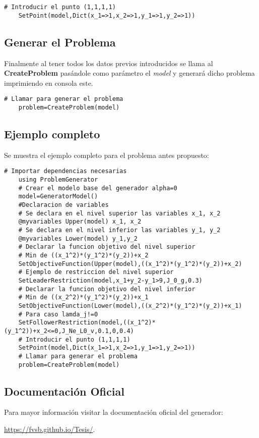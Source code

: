 \begin{lstlisting}[caption={Introducir el punto $(1,1,1,1)$}]
    # Introducir el punto (1,1,1,1)
    SetPoint(model,Dict(x_1=>1,x_2=>1,y_1=>1,y_2=>1))
\end{lstlisting}

\subsection{Generar el Problema}
Finalmente al tener todos los datos previos introducidos se llama al \textbf{CreateProblem} pasándole como parámetro el \textit{model} 
y generará dicho problema imprimiendo en consola este.

\begin{lstlisting}[caption={Generar el problema}]
    # Llamar para generar el problema
    problem=CreateProblem(model)
\end{lstlisting}
\begin{samepage}
    
\subsection{Ejemplo completo}
Se muestra el ejemplo completo para el problema antes propuesto:
\begin{lstlisting}[caption={Script}]
    # Importar dependencias necesarias
    using ProblemGenerator
    # Crear el modelo base del generador alpha=0
    model=GeneratorModel()
    #Declaracion de variables
    # Se declara en el nivel superior las variables x_1, x_2
    @myvariables Upper(model) x_1, x_2
    # Se declara en el nivel inferior las variables y_1, y_2
    @myvariables Lower(model) y_1,y_2
    # Declarar la funcion objetivo del nivel superior
    # Min de ((x_1^2)*(y_1^2)*(y_2))+x_2
    SetObjectiveFunction(Upper(model),((x_1^2)*(y_1^2)*(y_2))+x_2)
    # Ejemplo de restriccion del nivel superior
    SetLeaderRestriction(model,x_1+y_2-y_1>9,J_0_g,0.3)
    # Declarar la funcion objetivo del nivel inferior
    # Min de ((x_2^2)*(y_1^2)*(y_2))+x_1
    SetObjectiveFunction(Lower(model),((x_2^2)*(y_1^2)*(y_2))+x_1)
    # Para caso lamda_j!=0
    SetFollowerRestriction(model,((x_1^2)*(y_1^2))+x_2<=0,J_Ne_L0_v,0.1,0,0.4)
    # Introducir el punto (1,1,1,1)
    SetPoint(model,Dict(x_1=>1,x_2=>1,y_1=>1,y_2=>1))
    # Llamar para generar el problema
    problem=CreateProblem(model)
\end{lstlisting}

\end{samepage}
\subsection{Documentación Oficial}
Para mayor información visitar la documentación oficial del generador:

\begin{center}
\href{https://fvsb.github.io/Tesis/}{https://fvsb.github.io/Tesis/}. 
\end{center}
